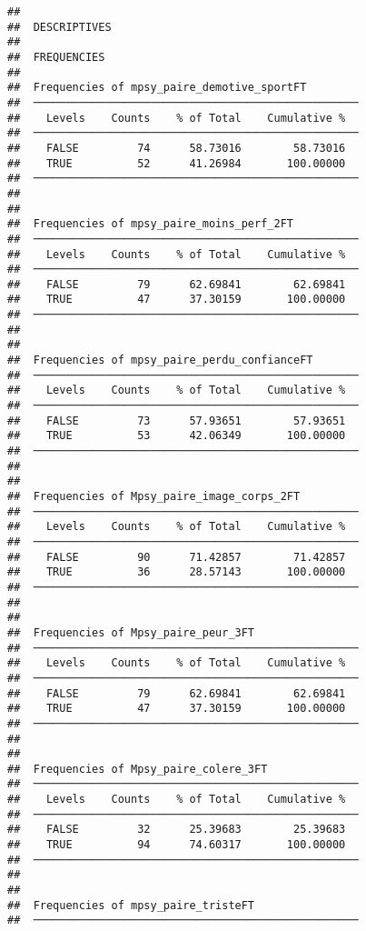 \documentclass[
]{article}
\begin{document}
\begin{verbatim}
## 
##  DESCRIPTIVES
## 
##  FREQUENCIES
## 
##  Frequencies of mpsy_paire_demotive_sportFT         
##  ────────────────────────────────────────────────── 
##    Levels    Counts    % of Total    Cumulative %   
##  ────────────────────────────────────────────────── 
##    FALSE         74      58.73016        58.73016   
##    TRUE          52      41.26984       100.00000   
##  ────────────────────────────────────────────────── 
## 
## 
##  Frequencies of mpsy_paire_moins_perf_2FT           
##  ────────────────────────────────────────────────── 
##    Levels    Counts    % of Total    Cumulative %   
##  ────────────────────────────────────────────────── 
##    FALSE         79      62.69841        62.69841   
##    TRUE          47      37.30159       100.00000   
##  ────────────────────────────────────────────────── 
## 
## 
##  Frequencies of mpsy_paire_perdu_confianceFT        
##  ────────────────────────────────────────────────── 
##    Levels    Counts    % of Total    Cumulative %   
##  ────────────────────────────────────────────────── 
##    FALSE         73      57.93651        57.93651   
##    TRUE          53      42.06349       100.00000   
##  ────────────────────────────────────────────────── 
## 
## 
##  Frequencies of Mpsy_paire_image_corps_2FT          
##  ────────────────────────────────────────────────── 
##    Levels    Counts    % of Total    Cumulative %   
##  ────────────────────────────────────────────────── 
##    FALSE         90      71.42857        71.42857   
##    TRUE          36      28.57143       100.00000   
##  ────────────────────────────────────────────────── 
## 
## 
##  Frequencies of Mpsy_paire_peur_3FT                 
##  ────────────────────────────────────────────────── 
##    Levels    Counts    % of Total    Cumulative %   
##  ────────────────────────────────────────────────── 
##    FALSE         79      62.69841        62.69841   
##    TRUE          47      37.30159       100.00000   
##  ────────────────────────────────────────────────── 
## 
## 
##  Frequencies of Mpsy_paire_colere_3FT               
##  ────────────────────────────────────────────────── 
##    Levels    Counts    % of Total    Cumulative %   
##  ────────────────────────────────────────────────── 
##    FALSE         32      25.39683        25.39683   
##    TRUE          94      74.60317       100.00000   
##  ────────────────────────────────────────────────── 
## 
## 
##  Frequencies of mpsy_paire_tristeFT                 
##  ────────────────────────────────────────────────── 

\end{verbatim}
\end{document}
